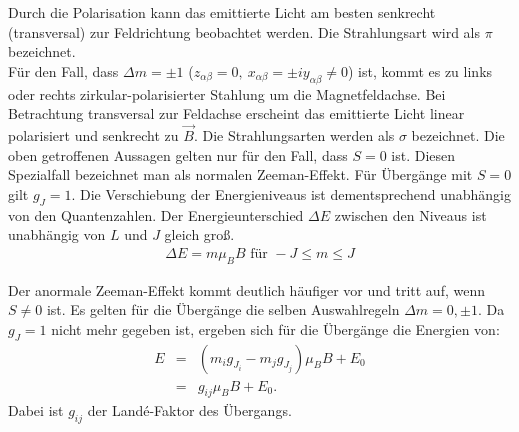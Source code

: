 Durch die Polarisation kann das emittierte Licht am besten senkrecht (transversal) zur Feldrichtung beobachtet werden.
Die Strahlungsart wird als $\pi$ bezeichnet.\\
%
Für den Fall, dass $\Delta m = \pm 1$ ($z_{\alpha\beta} = 0,\ x_{\alpha\beta} = \pm i y_{\alpha\beta} \neq 0$) ist, kommt es zu links oder rechts zirkular-polarisierter Stahlung um die Magnetfeldachse.
Bei Betrachtung transversal zur Feldachse erscheint das emittierte Licht linear polarisiert und senkrecht zu $\vec{B}$.
Die Strahlungsarten werden als $\sigma$ bezeichnet.
%
Die oben getroffenen Aussagen gelten nur für den Fall, dass $S=0$ ist.
Diesen Spezialfall bezeichnet man als normalen Zeeman-Effekt.
Für Übergänge mit $S=0$ gilt $g_J = 1$.
Die Verschiebung der Energieniveaus ist dementsprechend unabhängig von den Quantenzahlen.
Der Energieunterschied $\Delta E$ zwischen den Niveaus ist unabhängig von $L$ und $J$ gleich groß.
\begin{align}
  \Delta E = m \mu_B B \text{ für } -J \leq m \leq J
  \label{eqn:normal}
\end{align}

Der anormale Zeeman-Effekt kommt deutlich häufiger vor und tritt auf, wenn $S \neq 0$ ist.
Es gelten für die Übergänge die selben Auswahlregeln $\Delta m = 0, \pm 1$.
Da $g_J = 1$ nicht mehr gegeben ist, ergeben sich für die Übergänge die Energien von:
\begin{align}
	E &=& (m_ig_{J_i}-m_jg_{J_j})\mu_BB+E_0
  \label{eqn:anormal}\\
    &=& g_{ij}\mu_BB + E_0.
    \label{eqn:allgemein}  
\end{align}
Dabei ist $g_{ij}$ der Landé-Faktor des Übergangs.
\FloatBarrier

